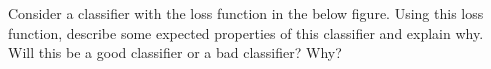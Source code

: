 Consider a classifier with the loss function in the below figure. Using this loss function, describe some expected properties of this classifier and explain why. Will this be a good classifier or a bad classifier? Why?



